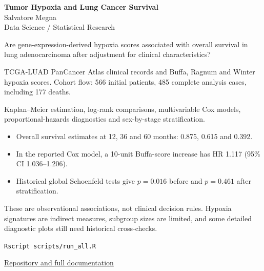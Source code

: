 \documentclass[12pt,a4paper]{article}
\begin{document}
\begin{center}
{\Large\bfseries Tumor Hypoxia and Lung Cancer Survival}\\[0.65em]
{\normalsize Salvatore Megna}\\[0.25em]
{\small Data Science / Statistical Research}
\end{center}
\vspace{1.1em}
\par
\vspace{1.15em}
\par
Are gene-expression-derived hypoxia scores associated with overall survival in lung adenocarcinoma after adjustment for clinical characteristics?
\par
\par
\vspace{1.15em}
\par
TCGA-LUAD PanCancer Atlas clinical records and Buffa, Ragnum and Winter hypoxia scores. Cohort flow: 566 initial patients, 485 complete analysis cases, including 177 deaths.

Kaplan--Meier estimation, log-rank comparisons, multivariable Cox models, proportional-hazards diagnostics and sex-by-stage stratification.
\par
\par
\vspace{1.15em}
\par
\begin{itemize}
\item Overall survival estimates at 12, 36 and 60 months: 0.875, 0.615 and 0.392.
\item In the reported Cox model, a 10-unit Buffa-score increase has HR 1.117 (95\% CI 1.036--1.206).
\item Historical global Schoenfeld tests give $p=0.016$ before and $p=0.461$ after stratification.
\end{itemize}
\par
\par
\vspace{1.15em}
\par
These are observational associations, not clinical decision rules. Hypoxia signatures are indirect measures, subgroup sizes are limited, and some detailed diagnostic plots still need historical cross-checks.
\par
\par
\vspace{1.15em}
\par
\texttt{Rscript scripts/run\_all.R}
\par
\vfill
\noindent\small\href{https://github.com/Salvatore-Megna/tcga-luad-hypoxia-survival}{Repository and full documentation}
\end{document}
